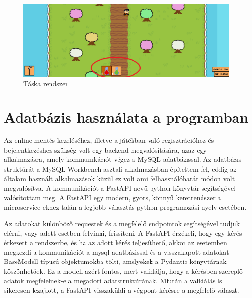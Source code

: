 \begin{figure}[H]
    \centering
    \includegraphics[width=15.5truecm]{images/inventory.png}
    \caption{Táska rendszer}
    \label{fig:Táska rendszer}
\end{figure}


\section{Adatbázis használata a programban}

 Az online mentés kezeléséhez, illetve a játékban való regisztrációhoz és bejelentkezéshez szükség volt egy backend megvalósítására, azaz egy alkalmazásra, amely kommunikációt végez a MySQL \cite{mysql} adatbázissal. Az adatbázis struktúrát a MySQL Workbench \cite{mysql-workbench} asztali alkalmazásban építettem fel, eddig az általam használt alkalmazások küzül ez volt ami felhasználóbarát módon volt megvalósítva.  A kommunikációt a FastAPI \cite{fastapi} nevű python könyvtár segítségével valósítottam meg. A FastAPI egy modern, gyors, könnyű keretrendszer a microservice-ekhez talán a legjobb választás python programozási nyelv esetében.

Az adatokat különböző requestek és a megfelelő endpointok segítségével tudjuk elérni, vagy adott esetben felvinni, frissíteni.
 A FastAPI érzékeli, hogy egy kérés érkezett a rendszerbe, és ha az adott kérés teljesíthető,
  akkor az esetemben megkezdi a kommunikációt a mysql adatbázissal és a visszakapott adatokat BaseModell \cite{basemodell} típusú objektumokba tölti,
   amelyekek a Pydantic \cite{pydantic} könyvtárnak köszönhetőek. Ez a modell azért fontos, mert validálja,
    hogy a kérésben szereplő adatok megfelelnek-e a megadott adatstruktúrának.
     Miután a validálás is sikeresen lezajlott, a FastAPI visszaküldi a végpont kérésre a megfelelő választ.

